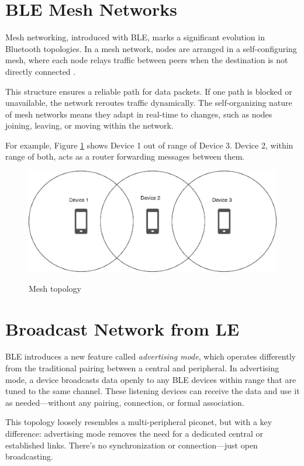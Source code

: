 \section{BLE Mesh Networks}

Mesh networking, introduced with BLE, marks a significant evolution in Bluetooth topologies. In a mesh network, nodes are arranged in a self-configuring mesh, where each node relays traffic between peers when the destination is not directly connected \cite{buildingBLEsystems}.

This structure ensures a reliable path for data packets. If one path is blocked or unavailable, the network reroutes traffic dynamically. The self-organizing nature of mesh networks means they adapt in real-time to changes, such as nodes joining, leaving, or moving within the network.

For example, Figure \ref{fig:mesh} shows Device 1 out of range of Device 3. Device 2, within range of both, acts as a router forwarding messages between them.
\begin{figure}[H]
    \caption{Mesh topology}
    \includegraphics[scale=.8]{mesh.png}
    \label{fig:mesh}
    \end{figure}

\section{Broadcast Network from LE}

BLE introduces a new feature called \textit{advertising mode}, which operates differently from the traditional pairing between a central and peripheral. In advertising mode, a device broadcasts data openly to any BLE devices within range that are tuned to the same channel. These listening devices can receive the data and use it as needed—without any pairing, connection, or formal association.

This topology loosely resembles a multi-peripheral piconet, but with a key difference: advertising mode removes the need for a dedicated central or established links. There’s no synchronization or connection—just open broadcasting.

